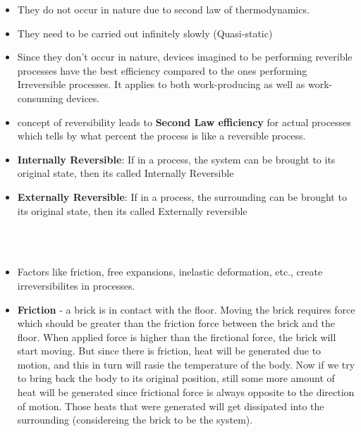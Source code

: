 \documentclass[8pt]{article}
\begin{document}
		\begin{itemize}
			\item They do not occur in nature due to second law of thermodynamics. 
			\item They need to be carried out infinitely slowly (Quasi-static)
			\item Since they don't occur in nature, devices imagined to be performing reverible processes have the best efficiency compared to the ones performing 	Irreversible processes. It applies to both work-producing as well as work-consuming devices.
			\item concept of reversibility leads to \textbf{Second Law efficiency} for actual processes which tells by what percent the process is like a reversible process.
			\item \textbf{Internally Reversible}: If in a process, the system can be brought to its original state, then its called Internally Reversible
			\item \textbf{Externally Reversible}: If in a process, the surrounding can be brought to its original state, then its called Externally reversible 
		\end{itemize}
\hrulefill\\
\\
		\begin{itemize}
			\item Factors like friction, free expansions, inelastic deformation, etc., create irreversibilites in processes.
			\item \textbf{Friction} - a brick is in contact with the floor. Moving the brick requires force which should be greater than the friction force between the brick and the floor. When applied force is higher than the firctional force, the brick will start moving. But since there is friction, heat will be generated due to motion, and this in turn will rasie the temperature of the body. Now if we try to bring back the body to its original position, still some more amount of heat will be generated since frictional force is always opposite to the direction of motion. Those heats that were generated will get dissipated into the surrounding (considereing the brick to be the system). 
		\end{itemize}
		\hrulefill\\	%
\\
\end{document}
